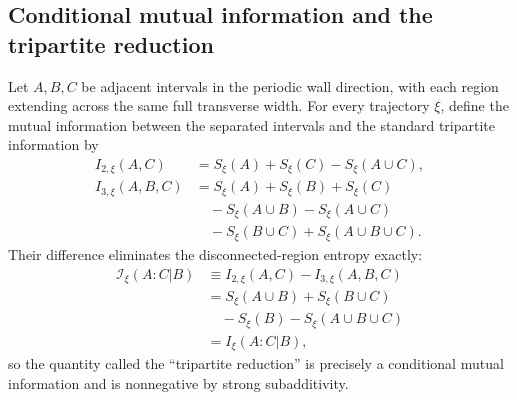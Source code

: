 \subsection{Conditional mutual information and the tripartite reduction}
\label{app:entropy-tmi-relation}

Let \(A,B,C\) be adjacent intervals in the periodic wall direction, with each
region extending across the same full transverse width.  For every trajectory
\(\xi\), define the mutual information between the separated intervals and
the standard tripartite information by
\begin{align}
    I_{2,\xi}(A,C)
    &=S_\xi(A)+S_\xi(C)-S_\xi(A\cup C),\nonumber\\
    I_{3,\xi}(A,B,C)
    &=S_\xi(A)+S_\xi(B)+S_\xi(C)\nonumber\\
    &\quad-S_\xi(A\cup B)-S_\xi(A\cup C)\nonumber\\
    &\quad-S_\xi(B\cup C)+S_\xi(A\cup B\cup C).
    \label{eq:app-I2-I3-definitions}
\end{align}
Their difference eliminates the disconnected-region entropy exactly:
\begin{align}
    \mathcal I_\xi(A:C|B)
    &\equiv I_{2,\xi}(A,C)-I_{3,\xi}(A,B,C)\nonumber\\
    &=S_\xi(A\cup B)+S_\xi(B\cup C)\nonumber\\
    &\quad-S_\xi(B)-S_\xi(A\cup B\cup C)\nonumber\\
    &=I_\xi(A:C|B),
    \label{eq:app-TMI-CMI-identity}
\end{align}
so the quantity called the ``tripartite reduction'' is precisely a
conditional mutual information and is nonnegative by strong subadditivity.

